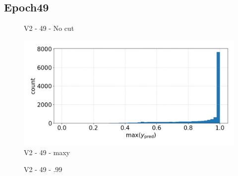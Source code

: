 \subsection{Epoch49}
\begin{figure}[h]
    \centering
    \qquad
    \caption{V2 - 49 - No cut\label{fig:synth_spectra}}
\end{figure}
\begin{figure}
    \centering
    \includegraphics[width=.6\linewidth]{figures/v2/vit_model_V2max_ypred_49.png}
    \caption{V2 - 49 - maxy}
    \label{fig:Epoch49}
\end{figure}
\begin{figure}[h]
    \centering
    \qquad
    \caption{V2 - 49 - .99\label{fig:synth_spectra}}
\end{figure}
